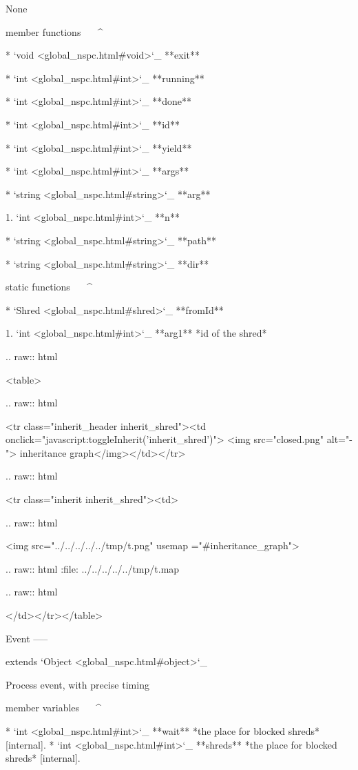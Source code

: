 	None

member functions
^^^^^^^^^^^^^^^^

	* `void <global_nspc.html#void>`_ **exit**

	* `int <global_nspc.html#int>`_ **running**

	* `int <global_nspc.html#int>`_ **done**

	* `int <global_nspc.html#int>`_ **id**

	* `int <global_nspc.html#int>`_ **yield**

	* `int <global_nspc.html#int>`_ **args**

	* `string <global_nspc.html#string>`_ **arg**

		1. `int <global_nspc.html#int>`_ **n**

	* `string <global_nspc.html#string>`_ **path**

	* `string <global_nspc.html#string>`_ **dir**

static functions
^^^^^^^^^^^^^^^^

	* `Shred <global_nspc.html#shred>`_ **fromId**

		1. `int <global_nspc.html#int>`_ **arg1** *id of the shred*


  .. raw:: html

   <table>


  .. raw:: html

   <tr class="inherit_header inherit_shred"><td onclick="javascript:toggleInherit('inherit_shred')"> <img src="closed.png" alt="-"> inheritance graph</img></td></tr>


  .. raw:: html

   <tr class="inherit inherit_shred"><td>


  .. raw:: html

   <img src="../../../../../tmp/t.png" usemap ="#inheritance_graph">


  .. raw:: html
   :file:   ../../../../../tmp/t.map


  .. raw:: html

   </td></tr></table>

Event
-----

extends `Object <global_nspc.html#object>`_ 

Process event, with precise timing

member variables
^^^^^^^^^^^^^^^^

	* `int <global_nspc.html#int>`_ **wait** *the place for blocked shreds*  [internal].
	* `int <global_nspc.html#int>`_ **shreds** *the place for blocked shreds*  [internal].


